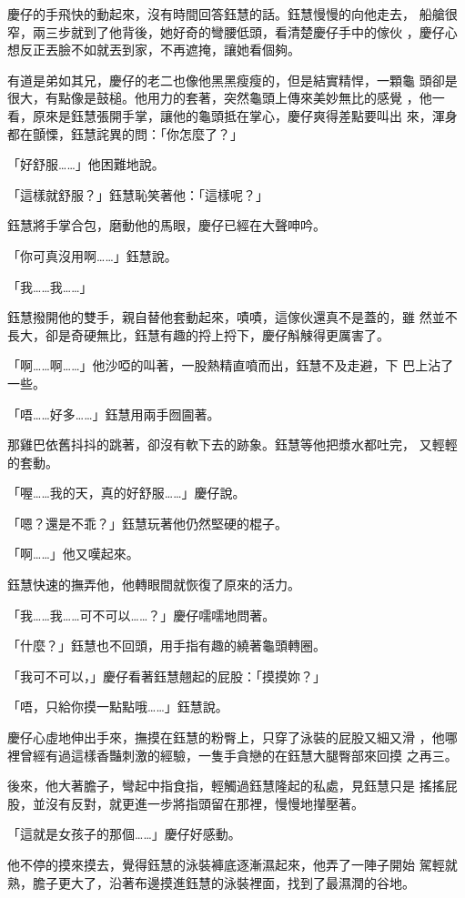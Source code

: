 慶仔的手飛快的動起來，沒有時間回答鈺慧的話。鈺慧慢慢的向他走去，
船艙很窄，兩三步就到了他背後，她好奇的彎腰低頭，看清楚慶仔手中的傢伙
，慶仔心想反正丟臉不如就丟到家，不再遮掩，讓她看個夠。

有道是弟如其兄，慶仔的老二也像他黑黑瘦瘦的，但是結實精悍，一顆龜
頭卻是很大，有點像是鼓槌。他用力的套著，突然龜頭上傳來美妙無比的感覺
，他一看，原來是鈺慧張開手掌，讓他的龜頭抵在掌心，慶仔爽得差點要叫出
來，渾身都在顫慄，鈺慧詫異的問：「你怎麼了？」

「好舒服……」他困難地說。

「這樣就舒服？」鈺慧恥笑著他：「這樣呢？」

鈺慧將手掌合包，磨動他的馬眼，慶仔已經在大聲呻吟。

「你可真沒用啊……」鈺慧說。

「我……我……」

鈺慧撥開他的雙手，親自替他套動起來，嘖嘖，這傢伙還真不是蓋的，雖
然並不長大，卻是奇硬無比，鈺慧有趣的捋上捋下，慶仔斛觫得更厲害了。

「啊……啊……」他沙啞的叫著，一股熱精直噴而出，鈺慧不及走避，下
巴上沾了一些。

「唔……好多……」鈺慧用兩手囫圇著。

那雞巴依舊抖抖的跳著，卻沒有軟下去的跡象。鈺慧等他把漿水都吐完，
又輕輕的套動。

「喔……我的天，真的好舒服……」慶仔說。

「嗯？還是不乖？」鈺慧玩著他仍然堅硬的棍子。

「啊……」他又嘆起來。

鈺慧快速的撫弄他，他轉眼間就恢復了原來的活力。

「我……我……可不可以……？」慶仔嚅嚅地問著。

「什麼？」鈺慧也不回頭，用手指有趣的繞著龜頭轉圈。

「我可不可以，」慶仔看著鈺慧翹起的屁股：「摸摸妳？」

「唔，只給你摸一點點哦……」鈺慧說。

慶仔心虛地伸出手來，撫摸在鈺慧的粉臀上，只穿了泳裝的屁股又細又滑
，他哪裡曾經有過這樣香豔刺激的經驗，一隻手貪戀的在鈺慧大腿臀部來回摸
之再三。

後來，他大著膽子，彎起中指食指，輕觸過鈺慧隆起的私處，見鈺慧只是
搖搖屁股，並沒有反對，就更進一步將指頭留在那裡，慢慢地攆壓著。

「這就是女孩子的那個……」慶仔好感動。

他不停的摸來摸去，覺得鈺慧的泳裝褲底逐漸濕起來，他弄了一陣子開始
駕輕就熟，膽子更大了，沿著布邊摸進鈺慧的泳裝裡面，找到了最濕潤的谷地。

